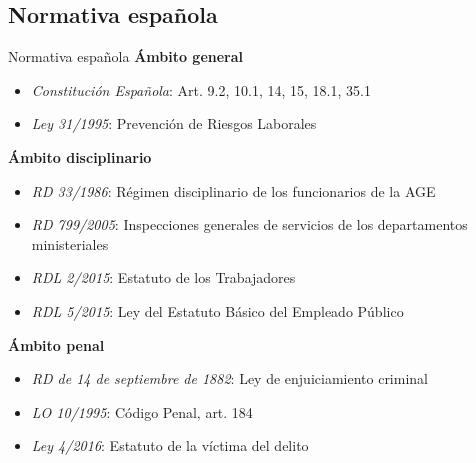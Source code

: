 \documentclass{beamer}
\begin{document}
    \subsection{Normativa española}
    \begin{frame}{Normativa española}
        \textbf{Ámbito general}
        \begin{itemize}
            \item \textit{Constitución Española}: Art. 9.2, 10.1, 14, 15, 18.1, 35.1
            \item \textit{Ley 31/1995}: Prevención de Riesgos Laborales
        \end{itemize}
        \textbf{Ámbito disciplinario}
        \begin{itemize}
            \item \textit{RD 33/1986}: Régimen disciplinario de los funcionarios de la AGE
            \item \textit{RD 799/2005}: Inspecciones generales de servicios de los departamentos ministeriales
            \item \textit{RDL 2/2015}: Estatuto de los Trabajadores
            \item \textit{RDL 5/2015}: Ley del Estatuto Básico del Empleado Público
        \end{itemize}
        \textbf{Ámbito penal}
        \begin{itemize}
            \item \textit{RD de 14 de septiembre de 1882}: Ley de enjuiciamiento criminal
            \item \textit{LO 10/1995}: Código Penal, art. 184
            \item \textit{Ley 4/2016}: Estatuto de la víctima del delito
        \end{itemize}
    \end{frame}
\end{document}
